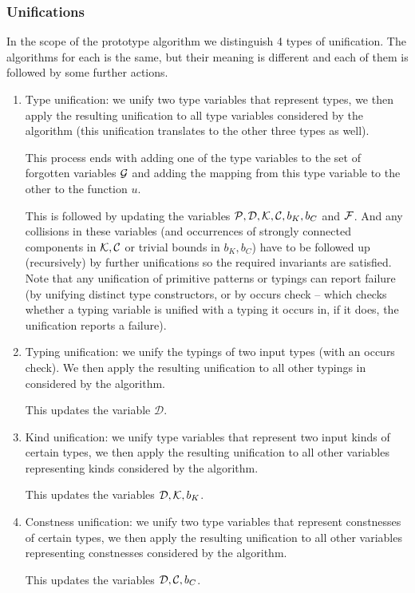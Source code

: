 \subsubsection{Unifications}
\label{unifications}

In the scope of the prototype algorithm we distinguish 4 types of unification. The algorithms for each is the same, but their meaning is different and each of them is followed by some further actions.

\begin{enumerate}
    \item Type unification: we unify two type variables that represent types, we then apply the resulting unification to all type variables considered by the algorithm (this unification translates to the other three types as well). \label{tUni}

    This process ends with adding one of the type variables to the set of forgotten variables $\mathcal G$ and adding the mapping from this type variable to the other to the function $u$.

    This is followed by updating the variables $\mathcal P, \mathcal D, \mathcal K, \mathcal C, b_K, b_C$ and $\mathcal F$. And any collisions in these variables (and occurrences of strongly connected components in $\mathcal K, \mathcal C$ or trivial bounds in $b_K, b_C$) have to be followed up (recursively) by further unifications so the required invariants are satisfied. Note that any unification of primitive patterns or typings can report failure (by unifying distinct type constructors, or by occurs check -- which checks whether a typing variable is unified with a typing it occurs in, if it does, the unification reports a failure).

    \item Typing unification: we unify the typings of two input types (with an occurs check). We then apply the resulting unification to all other typings in considered by the algorithm. \label{tyUni}

    This updates the variable $\mathcal D$.

    \item Kind unification: we unify type variables that represent two input kinds of certain types, we then apply the resulting unification to all other variables representing kinds considered by the algorithm. \label{kUni}

    This updates the variables $\mathcal D, \mathcal K, b_K$.

    \item Constness unification: we unify two type variables that represent constnesses of certain types, we then apply the resulting unification to all other variables representing constnesses considered by the algorithm. \label{cUni}

    This updates the variables $\mathcal D, \mathcal C, b_C$.
\end{enumerate}

